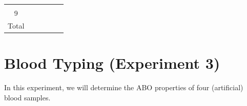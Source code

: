 \documentclass[]{book}
\theoremstyle{definition}
\theoremstyle{definition}
\theoremstyle{definition}
\theoremstyle{remark}
\begin{document}
\begin{longtable}[]{@{}clllll@{}}
\begin{minipage}[t]{0.19\columnwidth}
\strut
\end{minipage} & \begin{minipage}[t]{0.04\columnwidth}\raggedright\strut
\strut
\end{minipage}\tabularnewline
\begin{minipage}[t]{0.05\columnwidth}\centering\strut
9\strut
\end{minipage} & \begin{minipage}[t]{0.19\columnwidth}\raggedright\strut
\strut
\end{minipage} & \begin{minipage}[t]{0.19\columnwidth}\raggedright\strut
\strut
\end{minipage} & \begin{minipage}[t]{0.19\columnwidth}\raggedright\strut
\strut
\end{minipage} & \begin{minipage}[t]{0.19\columnwidth}\raggedright\strut
\strut
\end{minipage} & \begin{minipage}[t]{0.04\columnwidth}\raggedright\strut
\strut
\end{minipage}\tabularnewline
\begin{minipage}[t]{0.05\columnwidth}\centering\strut
Total\strut
\end{minipage} & \begin{minipage}[t]{0.19\columnwidth}\raggedright\strut
\strut
\end{minipage} & \begin{minipage}[t]{0.19\columnwidth}\raggedright\strut
\strut
\end{minipage} & \begin{minipage}[t]{0.19\columnwidth}\raggedright\strut
\strut
\end{minipage} & \begin{minipage}[t]{0.19\columnwidth}\raggedright\strut
\strut
\end{minipage} & \begin{minipage}[t]{0.04\columnwidth}\raggedright\strut
\strut
\end{minipage}\tabularnewline
\bottomrule
\end{longtable}

\section{Blood Typing (Experiment 3)}\label{blood-typing-experiment-3}

In this experiment, we will determine the ABO properties of four
(artificial) blood samples.
\end{document}
